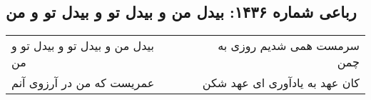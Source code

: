 \begin{center}
\section*{رباعی شماره ۱۴۳۶: بیدل من و بیدل تو و بیدل تو و من}
\label{sec:1436}
\begin{longtable}{l p{0.5cm} r}
بیدل من و بیدل تو و بیدل تو و من
&&
سرمست همی شدیم روزی به چمن
\\
عمریست که من در آرزوی آنم
&&
کان عهد به یادآوری ای عهد شکن
\\
\end{longtable}
\end{center}
